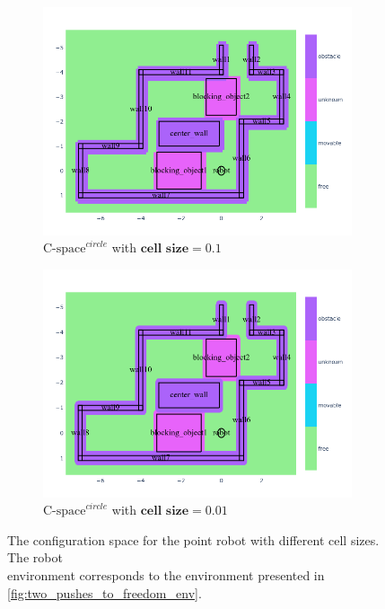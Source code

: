 \begin{figure}[H]
  \centering
  \begin{subfigure}{.49\textwidth}
    \centering
    \includegraphics[width=1.05\textwidth]{figures/planning/c_space_point_robot_grid_size_0_1}
    \caption{$\text{C-space}^{circle}$ with $\textbf{cell size} = 0.1$}%
    \label{fig:c_space_two_pushes_small}
  \end{subfigure}
  \begin{subfigure}{.49\textwidth}
    \centering
    \includegraphics[width=1.05\textwidth]{figures/planning/c_space_point_robot_grid_size_0_01}
    \caption{$\text{C-space}^{circle}$ with $\textbf{cell size} = 0.01$}%
    \label{fig:c_space_two_pushes_smaller}
  \end{subfigure}
  \caption{The configuration space for the point robot with different cell sizes. The robot\\environment corresponds to the environment presented in \cref{fig:two_pushes_to_freedom_env}.}
  \label{fig:two_pushes_to_freedom_conf_space}
\end{figure}

